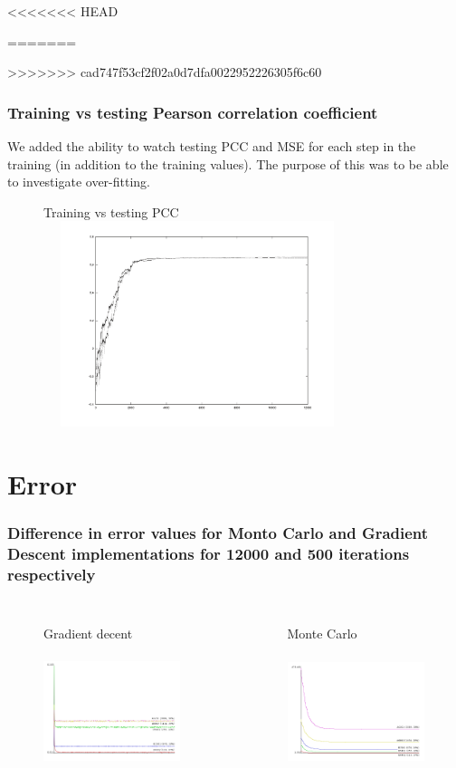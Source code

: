 \documentclass[presentation]{beamer}   %
\begin{document}
<<<<<<< HEAD
\begin{frame}
=======
\begin{frame}
>>>>>>> cad747f53cf2f02a0d7dfa0022952226305f6c60
\frametitle{Training vs testing Pearson correlation coefficient}
We added the ability to watch testing PCC and MSE for each step in the training (in addition to the training values). The purpose of this was to be able to investigate over-fitting.
		\begin{figure}
		\centering Training vs testing PCC
			\includegraphics[width=90mm,height=60mm]{fig/pcc2.pdf}
		\end{figure}
\end{frame}
\section{Error}
\begin{frame}
\frametitle{Difference in error values for Monto Carlo and Gradient Descent implementations for 12000 and 500 iterations respectively}
\begin{columns}[t] %
		\begin{figure}
		\centering Gradient decent
			\includegraphics[width=40mm,height=40mm]{fig/smm_error.png}
		\end{figure}
		\begin{figure}
			\centering Monte Carlo
			\includegraphics[width=40mm,height=40mm]{fig/smm_mc_error.png}
		\end{figure}
  \end{columns}
\end{frame}


\end{frame}
\end{document}
